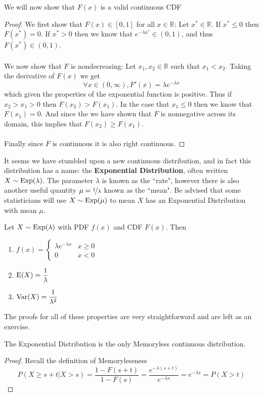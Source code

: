 We will now show that $F(x)$ is a valid continuous CDF
\begin{proof}
    We first show that $F(x)\in[0,1]$ for all $x\in\mathbb R$: Let $x^*\in\mathbb R$. If $x^*\le 0$ then $F(x^*)=0$. If $x^*> 0$ then we know that $e^{-\lambda x^*}\in (0,1)$, and thus $F(x^*)\in (0,1)$. 
    \\\\
    We now show that $F$ is nondecreasing: Let $x_1,x_2\in\mathbb R$ such that $x_1<x_2$. Taking the derivative of $F(x)$ we get
    \[
        \forall x\in(0,\infty), F'(x)=\lambda e^{-\lambda x}
    \]
    which given the properties of the exponential function is positive. Thus if $x_2>x_1>0$ then $F(x_2)>F(x_1)$. In the case that $x_1\le 0$ then we know that $F(x_1)=0$. And since the we have shown that $F$ is nonnegative across its domain, this implies that $F(x_2)\ge F(x_1)$.
    \\\\
    Finally since $F$ is continuous it is also right continuous.     
\end{proof}

It seems we have stumbled upon a new continuous distribution, and in fact this distribution has a name: the \textbf{Exponential Distribution}, often written $X\sim\textup{Exp}(\lambda)$. The parameter $\lambda$ is known as the ``rate", however there is also another useful quantity $\mu=\nicefrac 1 \lambda$ known as the ``mean". Be advised that some statisticians will use $X\sim\textup{Exp}(\mu)$ to mean $X$ has an Exponential Distribution with mean $\mu$.
\begin{theorem}
    Let $X\sim\textup{Exp}(\lambda)$ with PDF $f(x)$ and CDF $F(x)$. Then
    \begin{enumerate}
        \item $f(x)=\begin{cases}
        \lambda e^{-\lambda x} & x \ge 0
        \\
        0 & x < 0
        \end{cases}$
        \item $\textup{E}(X)=\displaystyle\frac 1 \lambda$
        \item $\textup{Var}(X)=\displaystyle\frac 1 {\lambda^2}$
    \end{enumerate}
    The proofs for all of these properties are very straightforward and are left as an exercise.
\end{theorem}

\begin{theorem}
    The Exponential Distribution is the only Memoryless continuous distribution.
    \begin{proof}
        Recall the definition of Memorylessness
        \[
            P(X\ge s+t| X>s)=\frac{1-F(s+t)}{1-F(s)}
            =\frac{e^{-\lambda (s+t)}}{e^{-\lambda s}}
            =e^{-\lambda s}
            =P(X>t)
        \]
        \todo
    \end{proof}
\end{theorem}



